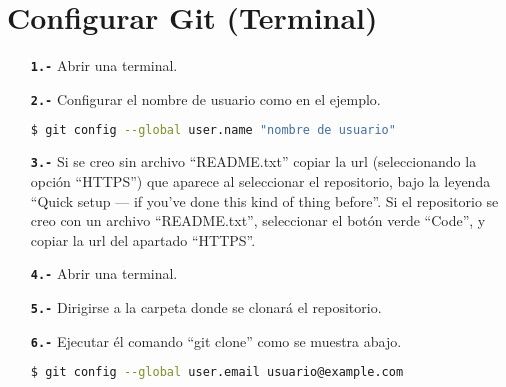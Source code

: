 \section{Configurar Git (Terminal)}
\begin{itemize}
	\item[\textbf{\texttt{1.-}}] Abrir una terminal.
	\item[\textbf{\texttt{2.-}}] Configurar el nombre de usuario como en el ejemplo.
	\begin{lstlisting}[language=bash, caption= Ejemplo. Cambiar de dirección]
$ git config --global user.name "nombre de usuario"\end{lstlisting}
	\item[\textbf{\texttt{3.-}}] Si se creo sin archivo ``README.txt'' copiar la url (seleccionando la opción ``HTTPS'') que aparece al seleccionar el repositorio, bajo la leyenda ``Quick setup — if you’ve done this kind of thing before''. Si el repositorio se creo con un archivo ``README.txt'', seleccionar el botón verde ``Code'', y copiar la url del apartado ``HTTPS''.
	\item[\textbf{\texttt{4.-}}] Abrir una terminal.
	\item[\textbf{\texttt{5.-}}] Dirigirse a la carpeta donde se clonará el repositorio.
	\item[\textbf{\texttt{6.-}}] Ejecutar él comando ``git clone'' como se muestra abajo.
	\begin{lstlisting}[language=bash, caption= Ejemplo. Clonar repositorio]
$ git config --global user.email usuario@example.com\end{lstlisting}
\end{itemize}